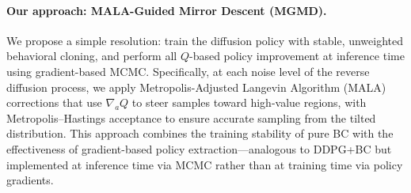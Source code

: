 \documentclass{article}
\theoremstyle{plain}
\theoremstyle{definition}
\theoremstyle{remark}
\begin{document}
\paragraph{Our approach: MALA-Guided Mirror Descent (MGMD).}
We propose a simple resolution: train the diffusion policy with stable, unweighted behavioral cloning, and perform all $Q$-based policy improvement at inference time using gradient-based MCMC.
Specifically, at each noise level of the reverse diffusion process, we apply Metropolis-Adjusted Langevin Algorithm (MALA) corrections that use $\nabla_a Q$ to steer samples toward high-value regions, with Metropolis--Hastings acceptance to ensure accurate sampling from the tilted distribution.
This approach combines the training stability of pure BC with the effectiveness of gradient-based policy extraction---analogous to DDPG+BC but implemented at inference time via MCMC rather than at training time via policy gradients.
\end{document}
